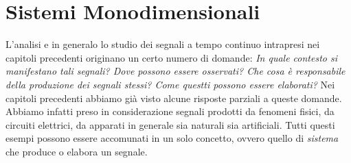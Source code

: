 \documentclass[12pt,oneside,openany]{memoir}
\numberwithin{equation}{subsection}
\begin{document}

\newpage
\section{Sistemi Monodimensionali}
L'analisi e in generalo lo studio dei segnali a tempo continuo intrapresi nei
capitoli precedenti originano un certo numero di domande: \textit{In quale
contesto si manifestano tali segnali? Dove possono essere osservati? Che cosa
\`e responsabile della produzione dei segnali stessi? Come questti possono
essere elaborati?} Nei capitoli precedenti abbiamo gi\`a visto alcune risposte
parziali a queste domande. Abbiamo infatti preso in considerazione segnali
prodotti da fenomeni fisici, da circuiti elettrici, da apparati in generale sia
naturali sia artificiali. Tutti questi esempi possono essere accomunati in un
solo concetto, ovvero quello di \textit{sistema} che produce o elabora un
segnale.


\newpage
\end{document}
